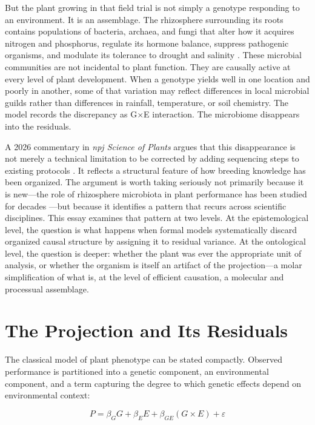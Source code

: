 \documentclass[11pt, a4paper]{article}
\begin{document}
But the plant growing in that field trial is not simply a genotype responding to an environment. It is an assemblage. The rhizosphere surrounding its roots contains populations of bacteria, archaea, and fungi that alter how it acquires nitrogen and phosphorus, regulate its hormone balance, suppress pathogenic organisms, and modulate its tolerance to drought and salinity \citep{oyserman2021}. These microbial communities are not incidental to plant function. They are causally active at every level of plant development. When a genotype yields well in one location and poorly in another, some of that variation may reflect differences in local microbial guilds rather than differences in rainfall, temperature, or soil chemistry. The model records the discrepancy as G$\times$E interaction. The microbiome disappears into the residuals.

A 2026 commentary in \textit{npj Science of Plants} argues that this disappearance is not merely a technical limitation to be corrected by adding sequencing steps to existing protocols \citep{araujo2026}. It reflects a structural feature of how breeding knowledge has been organized. The argument is worth taking seriously not primarily because it is new---the role of rhizosphere microbiota in plant performance has been studied for decades \citep{dwivedi2025, escudero2023}---but because it identifies a pattern that recurs across scientific disciplines. This essay examines that pattern at two levels. At the epistemological level, the question is what happens when formal models systematically discard organized causal structure by assigning it to residual variance. At the ontological level, the question is deeper: whether the plant was ever the appropriate unit of analysis, or whether the organism is itself an artifact of the projection---a molar simplification of what is, at the level of efficient causation, a molecular and processual assemblage.

\section{The Projection and Its Residuals}

The classical model of plant phenotype can be stated compactly. Observed performance is partitioned into a genetic component, an environmental component, and a term capturing the degree to which genetic effects depend on environmental context:

\[
P = \beta_G G + \beta_E E + \beta_{GE}(G \times E) + \varepsilon
\]
\end{document}
